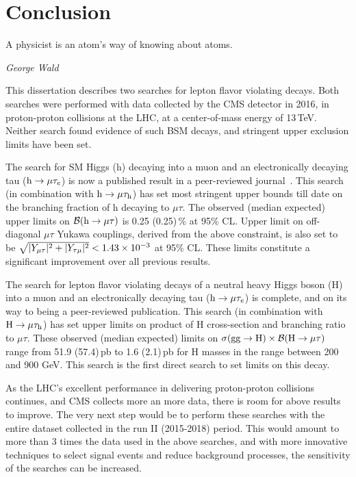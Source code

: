 %
%

\chapter{Conclusion}
\epigraph{A physicist is an atom's way of knowing about atoms.}{\textit{George Wald}}
\label{conclusion}

This dissertation describes two searches for lepton flavor violating decays. Both searches were performed with data collected by the CMS detector in 2016, in proton-proton collisions at the LHC, at a center-of-mass energy of 13\,TeV. Neither search found evidence of such BSM decays, and stringent upper exclusion limits have been set.

The search for SM Higgs (h) decaying into a muon and an electronically decaying tau ($\text{h} \to \mu \tau_{e}$) is now a published result in a peer-reviewed journal~\cite{HIG-17-001}. This search (in combination with $\text{h} \to \mu \tau_{\text{h}}$) has set most stringent upper bounds till date on the branching fraction of h decaying to $\mu\tau$. The observed (median expected) upper limits on $\mathcal{B}(\text{h} \to \mu \tau)$ is 0.25 (0.25)\,\% at 95\% CL. Upper limit on off-diagonal $\mu\tau$ Yukawa couplings, derived from the above constraint, is also set to be $\sqrt{|Y_{\mu\tau}|^{2}+|Y_{\tau\mu}|^{2}}<1.43\times 10^{-3}$ at 95\% CL. These limits constitute a significant improvement over all previous results.

The search for lepton flavor violating decays of a neutral heavy Higgs boson (H) into a muon and an electronically decaying tau ($\text{h} \to \mu \tau_{e}$) is complete, and on its way to being a peer-reviewed publication. This search (in combination with $\text{H} \to \mu \tau_{\text{h}}$) has set upper limits on product of H cross-section and branching ratio to $\mu\tau$. These observed (median expected) limits on $\sigma(\textrm{gg}\rightarrow \text{H})\times\mathcal{B}(\text{H} \to \mu \tau)$ range from 51.9 (57.4)\,pb to 1.6 (2.1)\,pb for H masses in the range between 200 and 900 GeV. This search is the first direct search to set limits on this decay.

As the LHC's excellent performance in delivering proton-proton collisions continues, and CMS collects more an more  data, there is room for above results to improve. The very next step would be to perform these searches with the entire dataset collected in the run II (2015-2018) period. This would amount to more than 3 times the data used in the above searches, and with more innovative techniques to select signal events and reduce background processes, the sensitivity of the searches can be increased. 






